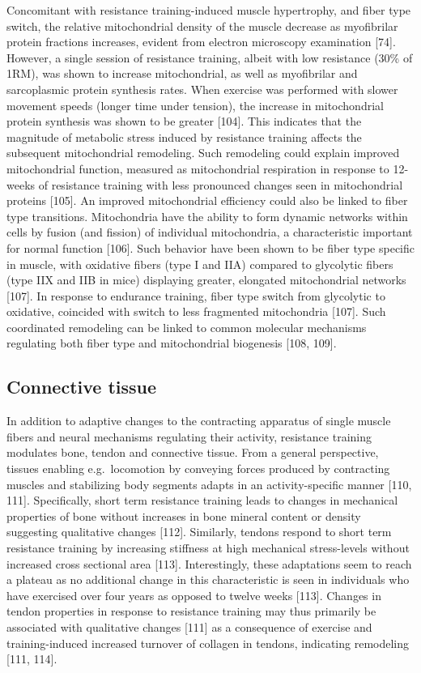 \documentclass[twoside,10pt]{gihclass} %
\begin{document}
Concomitant with resistance training-induced muscle hypertrophy, and fiber type switch, the relative mitochondrial density of the muscle decrease as myofibrilar protein fractions increases, evident from electron microscopy examination
{[}74{]}.
However, a single session of resistance training, albeit with low resistance (30\% of 1RM), was shown to increase mitochondrial, as well as myofibrilar and sarcoplasmic protein synthesis rates. When exercise was performed with slower movement speeds (longer time under tension), the increase in mitochondrial protein synthesis was shown to be greater
{[}104{]}.
This indicates that the magnitude of metabolic stress induced by resistance training affects the subsequent mitochondrial remodeling.
Such remodeling could explain improved mitochondrial function, measured as mitochondrial respiration in response to 12-weeks of resistance training with less pronounced changes seen in mitochondrial proteins
{[}105{]}.
An improved mitochondrial efficiency could also be linked to fiber type transitions.
Mitochondria have the ability to form dynamic networks within cells by fusion (and fission) of individual mitochondria, a characteristic important for normal function
{[}106{]}.
Such behavior have been shown to be fiber type specific in muscle, with oxidative fibers (type I and IIA) compared to glycolytic fibers (type IIX and IIB in mice) displaying greater, elongated mitochondrial networks
{[}107{]}.
In response to endurance training, fiber type switch from glycolytic to oxidative, coincided with switch to less fragmented mitochondria
{[}107{]}.
Such coordinated remodeling can be linked to common molecular mechanisms regulating both fiber type and mitochondrial biogenesis
{[}108, 109{]}.

\hypertarget{connective-tissue}{%
\subsection{Connective tissue}\label{connective-tissue}}

In addition to adaptive changes to the contracting apparatus of single muscle fibers and neural mechanisms regulating their activity, resistance training modulates bone, tendon and connective tissue.
From a general perspective, tissues enabling e.g.~locomotion by conveying forces produced by contracting muscles and stabilizing body segments adapts in an activity-specific manner
{[}110, 111{]}.
Specifically, short term resistance training leads to changes in mechanical properties of bone without increases in bone mineral content or density suggesting qualitative changes
{[}112{]}.
Similarly, tendons respond to short term resistance training by increasing stiffness at high mechanical stress-levels without increased cross sectional area
{[}113{]}.
Interestingly, these adaptations seem to reach a plateau as no additional change in this characteristic is seen in individuals who have exercised over four years as opposed to twelve weeks
{[}113{]}.
Changes in tendon properties in response to resistance training may thus primarily be associated with qualitative changes
{[}111{]}
as a consequence of exercise and training-induced increased turnover of collagen in tendons, indicating remodeling
{[}111, 114{]}.
\end{document}
